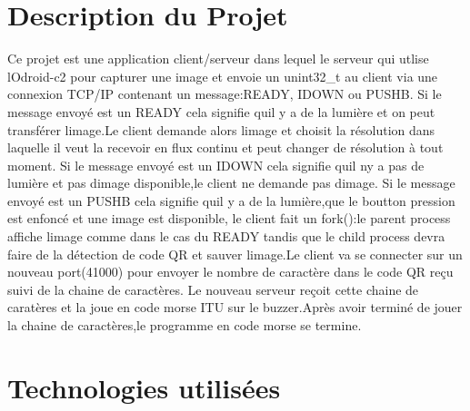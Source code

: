 \section*{Description du Projet}

Ce projet est une application client/serveur dans lequel le serveur qui utlise l\textquotesingle{}Odroid-\/c2 pour capturer une image et envoie un unint32\+\_\+t au client via une connexion T\+C\+P/\+IP contenant un message\+:R\+E\+A\+DY, I\+D\+O\+WN ou P\+U\+S\+HB. Si le message envoyé est un R\+E\+A\+DY cela signifie qu\textquotesingle{}il y a de la lumière et on peut transférer l\textquotesingle{}image.\+Le client demande alors l\textquotesingle{}image et choisit la résolution dans laquelle il veut la recevoir en flux continu et peut changer de résolution à tout moment. Si le message envoyé est un I\+D\+O\+WN cela signifie qu\textquotesingle{}il n\textquotesingle{}y a pas de lumière et pas d\textquotesingle{}image disponible,le client ne demande pas d\textquotesingle{}image. Si le message envoyé est un P\+U\+S\+HB cela signifie qu\textquotesingle{}il y a de la lumière,que le boutton pression est enfoncé et une image est disponible, le client fait un fork()\+:le parent process affiche l\textquotesingle{}image comme dans le cas du R\+E\+A\+DY tandis que le child process devra faire de la détection de code QR et sauver l\textquotesingle{}image.\+Le client va se connecter sur un nouveau port(41000) pour envoyer le nombre de caractère dans le code QR reçu suivi de la chaine de caractères. Le nouveau serveur reçoit cette chaine de caratères et la joue en code morse I\+TU sur le buzzer.\+Après avoir terminé de jouer la chaine de caractères,le programme en code morse se termine.



\section*{Technologies utilisées}

